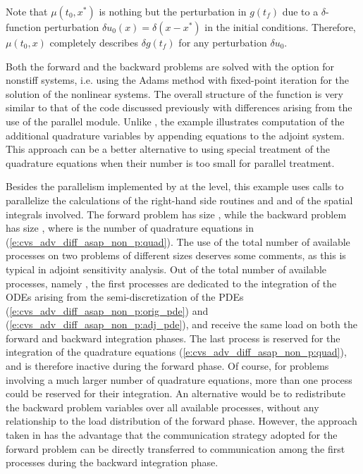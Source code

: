 Note that $\mu(t_0 , x^*)$ is nothing but the perturbation in $g(t_f)$
due to a $\delta$-function perturbation $\delta u_0(x) = \delta(x-x^*)$ in the
initial conditions.  Therefore, $\mu(t_0,x)$ completely describes $\delta g(t_f)$
for any perturbation $\delta u_0$.

Both the forward and the backward problems are solved with the option for nonstiff systems,
i.e. using the Adams method with fixed-point iteration for the solution of
the nonlinear systems. The overall structure of the  function is very
similar to that of the code  discussed previously with 
differences arising from the use of the parallel {\nvector} module. Unlike 
, the example  illustrates
computation of the additional quadrature variables by appending  equations
to the adjoint system.  This approach can be a better alternative to using special
treatment of the quadrature equations when their number is too small for parallel
treatment.

Besides the parallelism implemented by {\cvodes} at the {\nvector} level,
this example uses {\mpi} calls to parallelize the calculations of the
right-hand side routines  and  and of the spatial integrals involved.
The forward problem has size , while the backward problem has
size , where  is the number of quadrature equations
in (\ref{e:cvs_adv_diff_asap_non_p:quad}).
The use of the total number of available processes on two problems of different 
sizes deserves some comments, as this is typical in adjoint sensitivity 
analysis. Out of the total number of available processes, namely ,
the first  processes are dedicated to the integration of
the ODEs arising from the semi-discretization of the PDEs 
(\ref{e:cvs_adv_diff_asap_non_p:orig_pde}) and (\ref{e:cvs_adv_diff_asap_non_p:adj_pde}),
and receive the same load on both the forward and backward integration phases. 
The last process is reserved for the integration of the quadrature equations 
(\ref{e:cvs_adv_diff_asap_non_p:quad}), and is therefore inactive during the forward 
phase. Of course, for problems involving a much larger number of quadrature equations,
more than one process could be reserved for their integration. 
An alternative would be to redistribute the  backward problem variables 
over all available processes, without any relationship to the load distribution 
of the forward phase. However, the approach taken in 
has the advantage that the communication strategy adopted for the forward problem 
can be directly transferred to communication among the first 
processes during the backward integration phase. 

